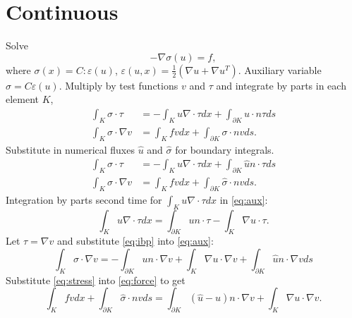 \documentclass{article}
\begin{document}
\section{Continuous}
	Solve
	\[
	-\nabla\sigma(u) = f,
	\]
	where $\sigma(x) = C:\varepsilon(u)$, 
		  $\varepsilon(u,x) = \frac{1}{2}(\nabla u + \nabla u^T)$.
	Auxiliary variable $\sigma = C\varepsilon(u)$.
	Multiply by test functions $v$ and $\tau$ and integrate by parts in each element $K$,
	\begin{align}
	\int_K \sigma \cdot \tau&=-\int_Ku\nabla\cdot \tau dx +\int_{\partial K}u \cdot n \tau ds\\
	\int_K \sigma \cdot \nabla v&=\int_K fv dx +\int_{\partial K}\sigma \cdot n v ds.
	\end{align}
	Substitute in numerical fluxes $\hat{u}$ and $\hat{\sigma}$ for boundary integrals.
	\begin{align}
	\int_K \sigma \cdot \tau&=-\int_Ku\nabla\cdot \tau dx +\int_{\partial K}\hat{u} n\cdot \tau ds \label{eq:aux}\\
	\int_K \sigma \cdot \nabla v&=\int_K fv dx +\int_{\partial K}\hat{\sigma} \cdot n v ds.
		\label{eq:force}
	\end{align}
	Integration by parts second time for $\int_Ku\nabla\cdot \tau dx$ in \autoref{eq:aux}:
	\begin{equation}
	\int_Ku\nabla\cdot \tau dx=\int_{\partial K}u n\cdot \tau-\int_K\nabla u\cdot \tau.
	\label{eq:ibp}
	\end{equation}
	Let $\tau=\nabla v$ and substitute \autoref{eq:ibp} into \autoref{eq:aux}:
	\begin{equation}
	\int_K \sigma \cdot \nabla v = -\int_{\partial K}u n\cdot \nabla v+\int_K\nabla u\cdot \nabla v +\int_{\partial K}\hat{u} n\cdot \nabla v ds 
	\label{eq:stress}
	\end{equation}
	Substitute \autoref{eq:stress} into \autoref{eq:force} to get
	\begin{equation}
	\int_K fvdx + \int_{\partial K}\hat{\sigma}\cdot nvds 
	= \int_{\partial K}(\hat{u}-u) n\cdot \nabla v+\int_K\nabla u\cdot \nabla v.
	\end{equation}
		
\end{document}
